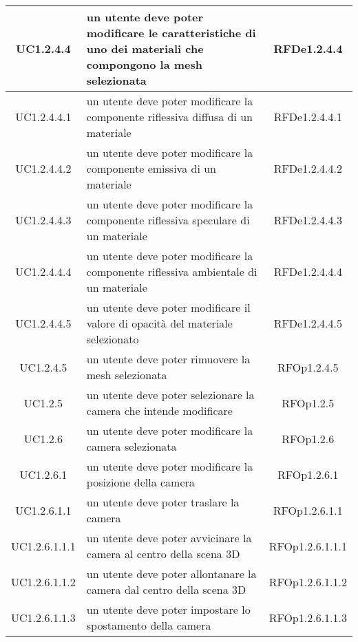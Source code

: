 \begin{longtable}{|c|p{7cm}|c|}
\midrule
UC1.2.4.4
& un utente deve poter modificare le caratteristiche di uno dei materiali che compongono la mesh selezionata
& RFDe1.2.4.4 \\


\midrule
UC1.2.4.4.1
& un utente deve poter modificare la componente riflessiva diffusa di un materiale
& RFDe1.2.4.4.1 \\


\midrule
UC1.2.4.4.2
& un utente deve poter modificare la componente emissiva di un materiale
& RFDe1.2.4.4.2 \\


\midrule
UC1.2.4.4.3
& un utente deve poter modificare la componente riflessiva speculare di un materiale
& RFDe1.2.4.4.3 \\


\midrule
UC1.2.4.4.4
& un utente deve poter modificare la componente riflessiva ambientale di un materiale
& RFDe1.2.4.4.4 \\


\midrule
UC1.2.4.4.5
& un utente deve poter modificare il valore di opacità del materiale selezionato
& RFDe1.2.4.4.5 \\


\midrule
UC1.2.4.5
& un utente deve poter rimuovere la mesh selezionata
& RFOp1.2.4.5 \\


\midrule
UC1.2.5
& un utente deve poter selezionare la camera che intende modificare
& RFOp1.2.5 \\


\midrule
UC1.2.6
& un utente deve poter modificare la camera selezionata
& RFOp1.2.6 \\


\midrule
UC1.2.6.1
& un utente deve poter modificare la posizione della camera
& RFOp1.2.6.1 \\


\midrule
UC1.2.6.1.1
& un utente deve poter traslare la camera
& RFOp1.2.6.1.1 \\


\midrule
UC1.2.6.1.1.1
& un utente deve poter avvicinare la camera al centro della scena 3D
& RFOp1.2.6.1.1.1 \\


\midrule
UC1.2.6.1.1.2
& un utente deve poter allontanare la camera dal centro della scena 3D
& RFOp1.2.6.1.1.2 \\


\midrule
UC1.2.6.1.1.3
& un utente deve poter impostare lo spostamento della camera
& RFOp1.2.6.1.1.3 \\



\end{longtable}
